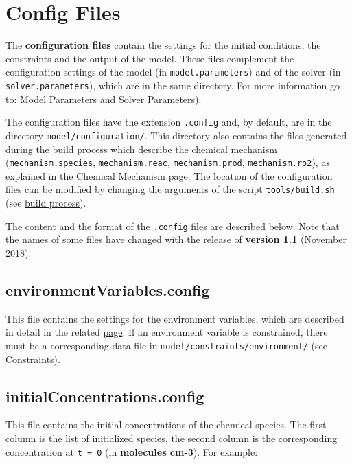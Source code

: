 \section{Config Files} \label{sec:config}

The \textbf{configuration files} contain the settings for the initial
conditions, the constraints and the output of the model. These files
complement the configuration settings of the model (in
\texttt{model.parameters}) and of the solver (in
\texttt{solver.parameters}), which are in the same directory. For more
information go to: \hyperref[sec:parameters]{Model Parameters} and
\hyperref[sec:solver]{Solver Parameters}).

The configuration files have the extension \texttt{.config} and, by
default, are in the directory \texttt{model/configuration/}. This
directory also contains the files generated during the
\hyperref[subsec:the-build-process]{build process} which describe the
chemical mechanism (\texttt{mechanism.species},
\texttt{mechanism.reac}, \texttt{mechanism.prod},
\texttt{mechanism.ro2}), as explained in the
\hyperref[sec:mechanism]{Chemical Mechanism} page. The location of the
configuration files can be modified by changing the arguments of the
script \texttt{tools/build.sh} (see
\hyperref[subsec:the-build-process]{build process}).

The content and the format of the \texttt{.config} files are described
below. Note that the names of some files have changed with the release
of \textbf{version 1.1} (November 2018).

\subsection{environmentVariables.config} \label{subsec:environmentvariables}

This file contains the settings for the environment variables, which
are described in detail in the related \hyperref[sec:envvar]{page}. If
an environment variable is constrained, there must be a corresponding
data file in \texttt{model/constraints/environment/} (see
\hyperref[sec:constraints]{Constraints}).

\subsection{initialConcentrations.config} \label{subsec:initialconcentrations}

This file contains the initial concentrations of the chemical species.
The first column is the list of initialized species, the second column
is the corresponding concentration at \texttt{t\ =\ 0} (in
\textbf{molecules cm-3}). For example:

